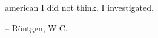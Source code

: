\thispagestyle{empty}
\vspace*{.25\textheight}
\begin{hyphendisplayquote}{american}
    \centering
    {\Huge I did not think. I investigated.}
    \begin{flushleft}
        {\large \hspace{3cm}-- Röntgen, W.C.}
    \end{flushleft}
\end{hyphendisplayquote}
\vspace*{\fill}